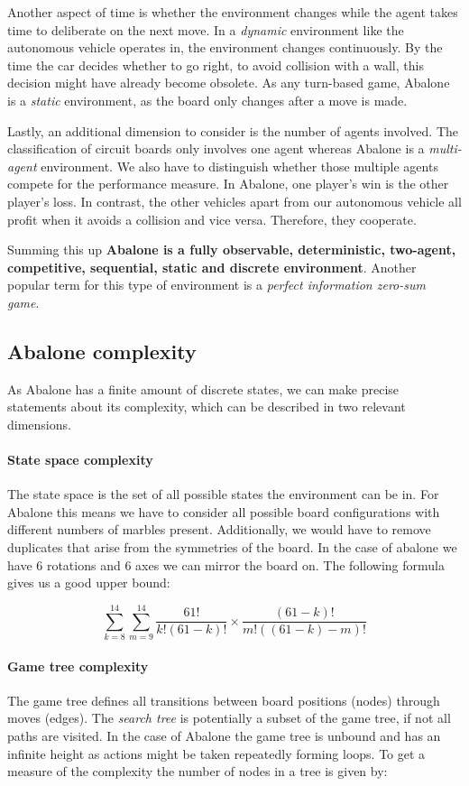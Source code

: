 Another aspect of time is whether the environment changes while the agent takes time to deliberate on the next move. In a \textit{dynamic} environment like the autonomous vehicle operates in, the environment changes continuously. By the time the car decides whether to go right, to avoid collision with a wall, this decision might have already become obsolete. As any turn-based game, Abalone is a \textit{static} environment, as the board only changes after a move is made.

Lastly, an additional dimension to consider is the number of agents involved. The classification of circuit boards only involves one agent whereas Abalone is a \textit{multi-agent} environment. We also have to distinguish whether those multiple agents compete for the performance measure. In Abalone, one player's win is the other player's loss. In contrast, the other vehicles apart from our autonomous vehicle all profit when it avoids a collision and vice versa. Therefore, they cooperate.

Summing this up \textbf{Abalone is a fully observable, deterministic, two-agent, competitive, sequential, static and discrete environment}. Another popular term for this type of environment is a \textit{perfect information zero-sum game}.

\subsection{Abalone complexity}

As Abalone has a finite amount of discrete states, we can make precise statements about its complexity, which can be described in two relevant dimensions.

\paragraph{State space complexity}
The state space is the set of all possible states the environment can be in.\cite[p. 150]{russell_artificial_2021} For Abalone this means we have to consider all possible board configurations with different numbers of marbles present. Additionally, we would have to remove duplicates that arise from the symmetries of the board. In the case of abalone we have 6 rotations and 6 axes we can mirror the board on. The following formula gives us a good upper bound:

$$
    \sum_{k=8}^{14}\sum_{m=9}^{14}\frac{61!}{k!(61-k)!}\times\frac{(61-k)!}{m!((61-k)-m)!}
$$

\paragraph{Game tree complexity} The game tree defines all transitions between board positions (nodes) through moves (edges). The \textit{search tree} is potentially a subset of the game tree, if not all paths are visited. In the case of Abalone the game tree is unbound and has an infinite height as actions might be taken repeatedly forming loops. To get a measure of the complexity the number of nodes in a tree is given by:

